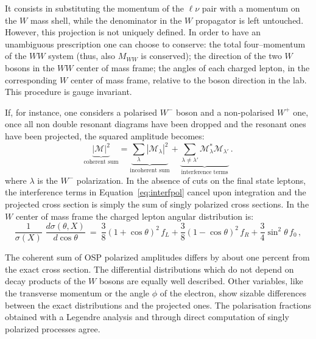 It consists in substituting the momentum of the $\ell\nu$ pair  with a momentum on the $W$ mass shell, 
while the denominator in the $W$ propagator is left untouched. However,
this projection is not uniquely defined. In order to have an unambiguous
prescription one can choose to conserve:
the total four--momentum of the $WW$ system (thus, also $M_{WW}$ is conserved);
the direction of the two $W$ bosons in the $WW$ center of mass frame;
the angles of each charged lepton, in the corresponding $W$ center of mass frame, relative to the boson
direction in the lab.
This procedure is gauge invariant. 

 If, for instance, one considers a polarised $W^-$
 boson and a non-polarised $W^+$ one, once all non double resonant diagrams have been dropped and the
 resonant ones have been projected,
the squared amplitude becomes:
\begin{equation}\label{eq:interfpol}
\underbrace{\left|\mathcal{M}\right|^2}_{\textrm{coherent sum}} = \underbrace{\sum_{\lambda}\left|
\mathcal{M}_{\lambda}\right|^2}_{\textrm{incoherent sum}} + \underbrace{\sum_{\lambda \neq \lambda'}
\mathcal{M}_{\lambda}^{ *}\mathcal{M}_{\lambda'}}_{\textrm{interference terms}}\,.
\end{equation}
where $\lambda$ is the $W^-$ polarization.
In the absence of cuts on the final state leptons, the interference terms in Equation~\ref{eq:interfpol} cancel upon 
integration and the projected cross section is simply the sum of singly polarized cross sections. 
In the $W$ center of mass frame the charged lepton angular distribution is: 
\begin{equation}
\frac{1}{\sigma(X)} \,\,\frac{d\sigma(\theta,X)}{d\cos\theta}
\ =\  \frac{3}{8} (1 + \cos\theta)^2 \,f_L
    + \frac{3}{8} (1 - \cos\theta)^2 \,f_R
    + \frac{3}{4} \sin^2\theta \, f_0 \,,
\label{eq:dcdist}
\end{equation}

The coherent sum of  OSP polarized amplitudes differs by about one percent from the exact cross section.
The differential distributions which do not depend on decay products of the
$W$ bosons are equally well described.
Other variables, like the transverse momentum or the
angle $\phi$ of the electron, show sizable differences  between the exact distributions and the projected 
ones.
The polarisation fractions obtained with a Legendre analysis and through direct computation of singly 
polarized processes agree.

